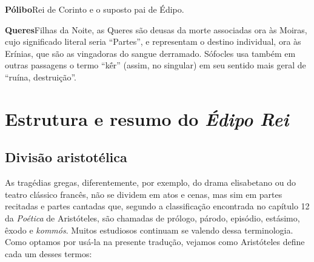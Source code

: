 \textbf{Pólibo}\quad Rei de Corinto e o suposto pai de Édipo.

\textbf{Queres}\quad Filhas da Noite, as Queres são deusas da morte
associadas ora às Moiras, cujo significado literal seria ``Partes'', e
representam o destino individual, ora às Erínias, que são as vingadoras
do sangue derramado. Sófocles usa também em outras passagens o termo
``kḗr'' (assim, no singular) em seu sentido mais geral de ``ruína,
destruição''.
\endgroup


\chapter{Estrutura e resumo do \emph{Édipo Rei}}\label{resumo}

\section{Divisão aristotélica} 

As tragédias gregas, diferentemente, por exemplo, do drama elisabetano
ou do teatro clássico francês, não se dividem em atos e cenas, mas sim
em partes recitadas e partes cantadas que, segundo a classificação
encontrada no capítulo 12 da \emph{Poética} de Aristóteles, são chamadas
de prólogo, párodo, episódio, estásimo, êxodo e \emph{kommós}. Muitos
estudiosos continuam se valendo dessa terminologia. Como optamos por
usá-la na presente tradução, vejamos como Aristóteles define cada um
desses termos:

